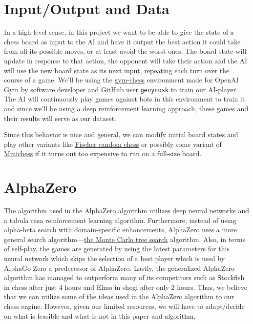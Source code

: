 \documentclass[notitlepage, 12pt]{article}
\begin{document}
\section*{Input/Output and Data}
In a high-level sense, in this project we want to be able to give the state of a chess board as input to the AI and have it output the best action it could take from all its possible moves, or at least avoid the worst ones. The board state will update in response to that action, the opponent will take their action and the AI will use the new board state as its next input, repeating each turn over the course of a game. We’ll be using the \href{https://github.com/genyrosk/gym-chess}{gym-chess} environment made for OpenAI Gym by software developer and GitHub user \texttt{genyrosk} to train our AI-player. The AI will continuously play games against bots in this environment to train it and since we’ll be using a deep reinforcement learning approach, these games and their results will serve as our dataset.

Since this behavior is nice and general, we can modify initial board states and play other variants like \href{https://en.wikipedia.org/wiki/Fischer_random_chess}{Fischer random chess} or possibly some variant of \href{https://en.wikipedia.org/wiki/Minichess}{Minichess} if it turns out too expensive to run on a full-size board.

\section*{AlphaZero}
The algorithm used in the AlphaZero algorithm utilizes deep neural networks and a tabula rasa reinforcement learning algorithm. Furthermore, instead of using alpha-beta search with domain-specific enhancements, AlphaZero uses a more general search algorithm—\href{https://en.wikipedia.org/wiki/Monte_Carlo_tree_search}{the Monte Carlo tree search} algorithm. Also, in terms of self-play, the games are generated by using the latest parameters for this neural network which skips the selection of a best player which is used by AlphaGo Zero a predecessor of AlphaZero. Lastly, the generalized AlphaZero algorithm has managed to outperform many of its competitors such as Stockfish in chess after just 4 hours and Elmo in shogi after only 2 hours. Thus, we believe that we can utilize some of the ideas used in the AlphaZero algorithm to our chess engine. However, given our limited resources, we will have to adapt/decide on what is feasible and what is not in this paper and algorithm.


\end{document}
